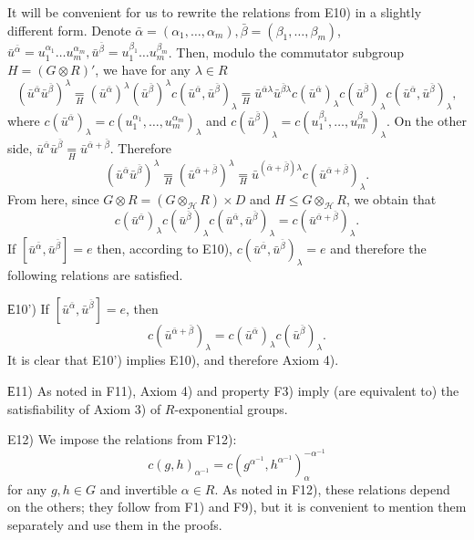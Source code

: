 \documentclass[11pt]{article}
\theoremstyle{definition}
\begin{document}
It will be convenient for us to rewrite the relations from E10) in a slightly different form. Denote $\bar \alpha = (\alpha_1, \ldots,\alpha_m), \bar \beta = (\beta_1, \ldots,\beta_m)$, $\bar u^{\bar \alpha} = u_1^{\alpha_1} \ldots u_m^{\alpha_m}, \bar u^{\bar \beta} = u_1^{\beta_1} \ldots u_m^{\beta_m}$. Then, modulo the commutator subgroup $H = (G\otimes R)'$, we have for any $\lambda \in R$
$$
(\bar u^{\bar \alpha} \bar u^{\bar \beta})^\lambda  \underset{H}{=} (\bar u^{\bar \alpha})^\lambda (\bar u^{\bar \beta})^\lambda c(\bar u^{\bar \alpha},\bar u^{\bar \beta})_\lambda \underset{H}{=} \bar u^{{\bar \alpha}\lambda } \bar u^{{\bar \beta}\lambda }c(\bar u^{\bar \alpha})_\lambda c(\bar u^{\bar \beta})_\lambda c(\bar u^{\bar \alpha}, \bar u^{\bar \beta})_\lambda, 
$$
where $c(\bar u^{\bar \alpha})_\lambda = c(u_1^{\alpha_1}, \ldots, u_m^{\alpha_m})_\lambda$ and $c(\bar u^{\bar \beta})_\lambda = c(u_1^{\beta_1}, \ldots , u_m^{\beta_m})_\lambda$. 
On the other side, $\bar u^{\bar \alpha} \bar u^{\bar \beta} \underset{H}{=} \bar u^{\bar \alpha +\bar \beta}$. Therefore
$$
(\bar u^{\bar \alpha} \bar u^{\bar \beta})^\lambda  \underset{H}{=} (\bar u^{\bar \alpha +\bar \beta})^\lambda \underset{H}{=} \bar u^{(\bar \alpha +\bar \beta)\lambda} c(\bar u^{\bar \alpha +\bar \beta})_\lambda.
$$
From here, since $G\otimes R = (G\otimes_{\mathcal{H}} R) \times D$ and $H \leq G\otimes_{\mathcal{H}} R$, we obtain that
$$
c(\bar u^{\bar \alpha})_\lambda c(\bar u^{\bar \beta})_\lambda c(\bar u^{\bar \alpha}, \bar u^{\bar \beta})_\lambda = c(\bar u^{\bar \alpha +\bar \beta})_\lambda.
$$
If $[\bar u^{\bar \alpha}, \bar u^{\bar \beta}] = e$ then, according to E10), $c(\bar u^{\bar \alpha}, \bar u^{\bar \beta})_\lambda =e$ and therefore the following relations are satisfied.

\medskip
\noindent
Е10')  If $[\bar u^{\bar \alpha}, \bar u^{\bar \beta}] = e$, then 
\begin{equation} \label{eq:E11)}
c(\bar u^{\bar \alpha +\bar \beta})_\lambda =  c(\bar u^{\bar \alpha})_\lambda c(\bar u^{\bar \beta})_\lambda .   
\end{equation}
It is clear that E10') implies E10), and therefore Axiom 4).

\medskip
\noindent
Е11) As noted in F11), Axiom 4) and property F3) imply (are equivalent to) the satisfiability of Axiom 3) of $R$-exponential groups.


\medskip
\noindent
E12) We impose the relations from F12):
$$
c(g,h)_{\alpha^{-1}}=c(g^{\alpha^{-1}},h^{\alpha^{-1}})_\alpha^{-\alpha^{-1}}
$$
for any $g, h \in G$ and invertible $\alpha \in R$. As noted in F12), these relations depend on the others; they follow from F1) and F9), but it is convenient to mention them separately and use them in the proofs.
\end{document}
